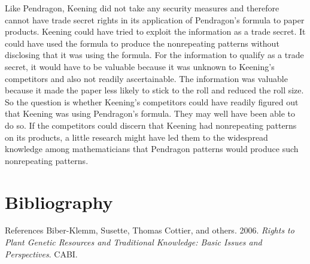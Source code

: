 \documentclass[
  ignorenonframetext,
  aspectratio=169]{beamer}
\newlength{\cslhangindent}
\newenvironment{cslreferences}%
  {\setlength{\parindent}{0pt}%
  \everypar{\setlength{\hangindent}{\cslhangindent}}\ignorespaces}%
  {\par}
\begin{document}
\begin{frame}{}
\protect\hypertarget{section-15}{}
\footnotesize

Like Pendragon, Keening did not take any security measures and therefore
cannot have trade secret rights in its application of Pendragon's
formula to paper products. Keening could have tried to exploit the
information as a trade secret. It could have used the formula to produce
the nonrepeating patterns without disclosing that it was using the
formula. For the information to qualify as a trade secret, it would have
to be valuable because it was unknown to Keening's competitors and also
not readily ascertainable. The information was valuable because it made
the paper less likely to stick to the roll and reduced the roll size. So
the question is whether Keening's competitors could have readily figured
out that Keening was using Pendragon's formula. They may well have been
able to do so. If the competitors could discern that Keening had
nonrepeating patterns on its products, a little research might have led
them to the widespread knowledge among mathematicians that Pendragon
patterns would produce such nonrepeating patterns.
\end{frame}

\hypertarget{bibliography}{%
\section{Bibliography}\label{bibliography}}

\begin{frame}{References}
\protect\hypertarget{references}{}
\hypertarget{refs}{}
\begin{cslreferences}
\leavevmode\hypertarget{ref-biber2006rights}{}%
Biber-Klemm, Susette, Thomas Cottier, and others. 2006. \emph{Rights to
Plant Genetic Resources and Traditional Knowledge: Basic Issues and
Perspectives}. CABI.
\end{cslreferences}
\end{frame}
\end{document}
